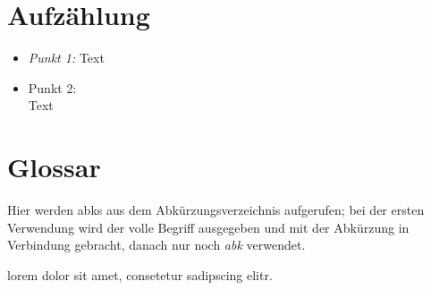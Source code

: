 \section{Aufzählung}

\begin{itemize}
\item\textit{Punkt 1:} Text
\item Punkt 2: \\ Text
\end{itemize}

\section{Glossar}
Hier werden \glspl{abk} aus dem Abkürzungsverzeichnis aufgerufen; bei der ersten Verwendung wird der volle Begriff ausgegeben und mit der Abkürzung in Verbindung gebracht, danach nur noch \emph{\gls{abk}} verwendet.

\gls{lorem} dolor sit amet, consetetur sadipscing elitr.
